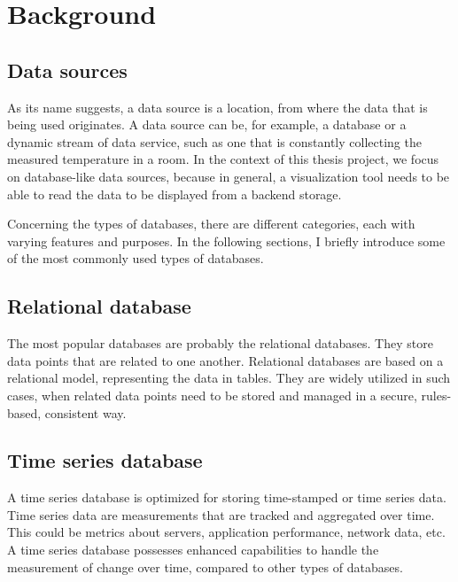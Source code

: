 \chapter{Background}

\section{Data sources}


As its name suggests, a data source is a location, from where the data that is being used originates. A data source can be, for example, a database or a dynamic stream of data service, such as one that is constantly collecting the measured temperature in a room. In the context of this thesis project, we focus on database-like data sources, because in general, a visualization tool needs to be able to read the data to be displayed from a backend storage. \cite{talend-datasource} \cite{techopedia-datasource}

Concerning the types of databases, there are different categories, each with varying features and purposes. In the following sections, I briefly introduce some of the most commonly used types of databases.

\section{Relational database}

The most popular databases are probably the relational databases. They store data points that are related to one another. Relational databases are based on a relational model, representing the data in tables. They are widely utilized in such cases, when related data points need to be stored and managed in a secure, rules-based, consistent way. \cite{relational-database-oracle}

\section{Time series database}


A time series database is optimized for storing time-stamped or time series data. Time series data are measurements that are tracked and aggregated over time. This could be metrics about servers, application performance, network data, etc. A time series database possesses enhanced capabilities to handle the measurement of change over time, compared to other types of databases. \cite{timeseries-database-influxdata}


